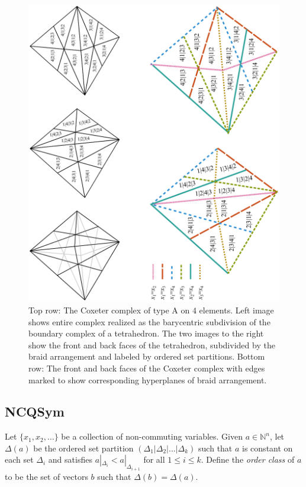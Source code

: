 \documentclass[12pt,reqno]{amsart}
\numberwithin{definition}{section}
\theoremstyle{definition}
\begin{document}
\begin{figure}[h]
\includegraphics[angle=270,width=5.5in]{coxeter.pdf}
\caption{Top row: The Coxeter complex of type A on $4$ elements. Left image shows entire complex realized as the barycentric subdivision of the boundary complex of a tetrahedron. The two images to the right show the front and back faces of the tetrahedron, subdivided by the braid arrangement and labeled by ordered set partitions. Bottom row: The front and back faces of the Coxeter complex with edges marked to show corresponding hyperplanes of braid arrangement.}
\end{figure}

\subsection{NCQSym}


Let $\{x_1, x_2, \ldots \}$ be a collection of non-commuting
variables.  Given $a \in \mathbb{N}^n$, let $\Delta(a)$
be the ordered set partition $(\Delta_1 | \Delta_2 | \ldots | \Delta_k)$ such that 
$a$ is constant on each set $\Delta_i$
and satisfies $a|_{\Delta_i} < a|_{\Delta_{i+1}}$ for all $1 \leq i \leq k$. 
Define the \emph{order class} of $a$ to be the set of vectors $b$
such that $\Delta(b) = \Delta(a)$.  
\end{document}

